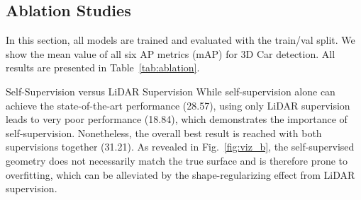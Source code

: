 \documentclass[10pt,twocolumn,letterpaper]{article}
\makeatletter
\renewcommand{\paragraph}{
  \@startsection{paragraph}{4}
  {\z@}{0.7ex \@plus .2ex \@minus .1ex}{-1em}
  {\normalfont\normalsize\bfseries}
}
\makeatother
\begin{document}
\subsection{Ablation Studies} \label{ablation}
In this section, all models are trained and evaluated with the train/val split. We show the mean value of all six AP metrics (mAP) for 3D Car detection. All results are presented in Table~\ref{tab:ablation}.

\paragraph{Self-Supervision versus LiDAR Supervision}
While self-supervision alone can achieve the state-of-the-art performance (28.57), using only LiDAR supervision leads to very poor performance (18.84), which demonstrates the importance of self-supervision. Nonetheless, the overall best result is reached with both supervisions together (31.21). As revealed in Fig.~\ref{fig:viz_b}, the self-supervised geometry does not necessarily match the true surface and is therefore prone to overfitting, which can be alleviated by the shape-regularizing effect from LiDAR supervision.
\end{document}
